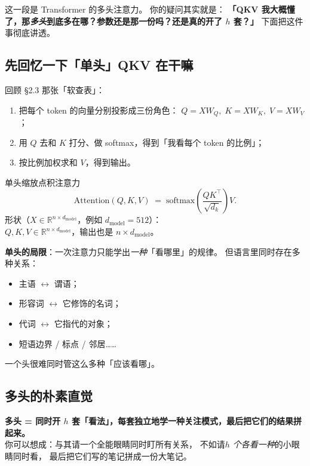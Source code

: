 \documentclass[11pt,a4paper]{ctexart}
\newcommand{\R}{\mathbb{R}}
\newcommand{\softmax}{\mathrm{softmax}}
\begin{document}
这一段是 Transformer 的多头注意力。
你的疑问其实就是：
\textbf{「QKV 我大概懂了，那\emph{多头}到底多在哪？参数还是那一份吗？还是真的开了 $h$ 套？」}
下面把这件事彻底讲透。

\subsection{先回忆一下「单头」QKV 在干嘛}

回顾 §2.3 那张「软查表」：

\begin{enumerate}
  \item 把每个 token 的向量分别投影成三份角色：
        $Q = X W_Q,\; K = X W_K,\; V = X W_V$；
  \item 用 $Q$ 去和 $K$ 打分、做 softmax，得到「我看每个 token 的比例」；
  \item 按比例加权求和 $V$，得到输出。
\end{enumerate}

\begin{mathbox}{单头缩放点积注意力}
\[
  \mathrm{Attention}(Q, K, V) \;=\;
  \softmax\!\left(\frac{Q K^\top}{\sqrt{d_k}}\right) V.
\]
形状（$X \in \R^{n \times d_{\text{model}}}$，例如 $d_{\text{model}} = 512$）：\\
$Q, K, V \in \R^{n \times d_{\text{model}}}$，输出也是 $n \times d_{\text{model}}$。
\end{mathbox}

\textbf{单头的局限}：一次注意力只能学出\emph{一种}「看哪里」的规律。
但语言里同时存在多种关系：
\begin{itemize}
  \item 主语 $\leftrightarrow$ 谓语；
  \item 形容词 $\leftrightarrow$ 它修饰的名词；
  \item 代词 $\leftrightarrow$ 它指代的对象；
  \item 短语边界 / 标点 / 邻居……
\end{itemize}
一个头很难同时管这么多种「应该看哪」。

\subsection{多头的朴素直觉}

\begin{intuitionblock}
\textbf{多头 = 同时开 $h$ 套「看法」，每套独立地学一种关注模式，最后把它们的结果拼起来。}\\
你可以想成：与其请一个全能眼睛同时盯所有关系，
不如请\emph{$h$ 个各看一种}的小眼睛同时看，
最后把它们写的笔记拼成一份大笔记。
\end{intuitionblock}
\end{document}
